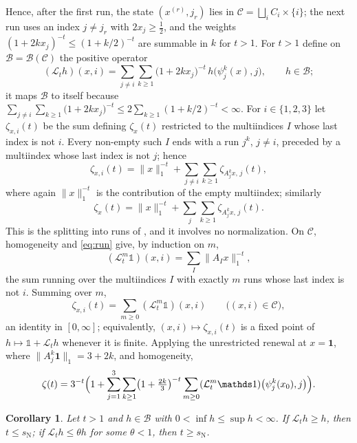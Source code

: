 \documentclass[11pt]{amsart}
\newtheorem{corollary}[proposition]{Corollary}
\theoremstyle{definition}
\theoremstyle{remark}
\newcommand{\one}{\mathbf 1}
\newcommand{\cL}{\mathcal L}
\newcommand{\sN}{s_{\mathrm N}}
\newcommand{\norm}[1]{\lVert #1\rVert}
\begin{document}
Hence, after the first run, the state $(x^{(r)},j_r)$ lies in
$\mathcal C=\bigsqcup_iC_i\times\{i\}$; the next run uses an index $j\neq j_r$
with $2x_j\ge\frac12$, and the weights $(1+2kx_j)^{-t}\le(1+k/2)^{-t}$
are summable in $k$ for $t>1$. For $t>1$ define on
$\mathcal B=\mathcal B(\mathcal C)$ the positive operator
\[
  (\cL_th)(x,i)=\sum_{j\neq i}\sum_{k\ge1}\bigl(1+2kx_j\bigr)^{-t}\,
  h\bigl(\psi_j^k(x),j\bigr),\qquad h\in\mathcal B;
\]
it maps $\mathcal B$ to itself because
$\sum_{j\neq i}\sum_{k\ge1}\bigl(1+2kx_j\bigr)^{-t}\le2\sum_{k\ge1}(1+k/2)^{-t}<\infty$.
For $i\in\{1,2,3\}$ let $\zeta_{x,i}(t)$ be the sum defining $\zeta_x(t)$ restricted
to the multiindices $I$ whose last index is not $i$. Every non-empty such $I$ ends with a
run $j^k$, $j\neq i$, preceded by a multiindex whose last index is not $j$; hence
\begin{equation}\label{eq:renewal}
  \zeta_{x,i}(t)=\norm{x}_1^{-t}+\sum_{j\neq i}\sum_{k\ge1}\zeta_{A_j^kx,\,j}(t),
\end{equation}
where again $\norm{x}_1^{-t}$ is the contribution of the empty multiindex; similarly
\[
\zeta_x(t)=\norm{x}_1^{-t}+\sum_{j}\sum_{k\ge1}\zeta_{A_j^kx,\,j}(t).
\]
This is the splitting into runs of \cite{DL15JGA}, and it involves no
normalization.
On $\mathcal C$, homogeneity and \eqref{eq:run} give, by induction on $m$,
\begin{equation}\label{eq:Lm}
  (\cL_t^m\mathds 1)(x,i)=\sum_{I}\norm{A_Ix}_1^{-t},
\end{equation}
the sum running over the multiindices $I$ with exactly $m$ runs whose last index is not $i$. Summing over $m$,
\[
\zeta_{x,i}(t)=\sum_{m\ge0}(\cL_t^m\mathds 1)(x,i)\qquad\bigl((x,i)\in\mathcal C\bigr),
\]
an identity in $[0,\infty]$; equivalently, $(x,i)\mapsto\zeta_{x,i}(t)$ is a fixed point of $h\mapsto\mathds 1+\cL_th$ whenever it is finite.
Applying the unrestricted renewal at $x=\one$, where $\norm{A_j^k\one}_1=3+2k$, and homogeneity,
\begin{equation}\label{eq:zeta}
  \zeta(t)=3^{-t}\Bigl(1+\sum_{j=1}^3\sum_{k\ge1}\bigl(1+\tfrac{2k}3\bigr)^{-t}
  \sum_{m\ge0}(\cL_t^m\mathds 1)\bigl(\psi_j^k(x_0),j\bigr)\Bigr).
\end{equation}

\begin{corollary}\label{cor:test}
Let $t>1$ and $h\in\mathcal B$ with $0<\inf h\le\sup h<\infty$. If $\cL_th\ge h$,
then $t\le\sN$; if $\cL_th\le\theta h$ for some $\theta<1$, then $t\ge\sN$.
\end{corollary}
\end{document}
